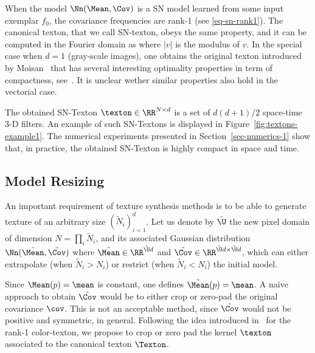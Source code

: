 When the model $\Nn(\Mean,\Cov)$ is a SN model learned from some input exemplar $f_0$, the covariance frequencies are rank-1 (see \eqref{eq-sn-rank1}). The canonical texton, that we call SN-texton, obeys the same property, and it can be computed in the Fourier domain as 
where $|v|$ is the modulus of $v$.
In the special case when $d=1$ (gray-scale images), one obtains the original texton introduced by Moisan~\cite{}
that has several interesting optimality properties in term of compactness, see~\cite{}. It is unclear wether similar properties also hold in the vectorial case. 

The obtained SN-Texton $\texton \in \RR^{N \times d}$ is a set of $d(d+1)/2$ space-time 3-D filters. 
An example of such SN-Textons is displayed in Figure~\ref{fig:textons-example1}. The numerical experiments presented in Section~\ref{sec-numerics-1} show that, in practice, the obtained SN-Texton is highly compact in space and time. 


\subsection{Model Resizing}

An important requirement of texture synthesis methods is to be able to generate texture of an arbitrary size $(\tilde N_i)_{i=1}^d$. Let us denote by $\tilde \U$ the new pixel domain of dimension $N=\prod_i \tilde N_i$, and its associated Gaussian distribution $\Nn(\tilde \Mean, \tilde\Cov)$ where $\tilde \Mean \in \RR^{\tilde \U d}$ and $\tilde \Cov \in \RR^{\tilde \U d \times \tilde \U d}$, which can either extrapolate (when $\tilde N_i>N_i$) or restrict (when $\tilde N_i<N_i$) the initial model. 


Since $\Mean(p) = \mean$ is constant, one defines $\tilde \Mean(p) = \mean$. A naive approach to obtain $\tilde \Cov$ would be to either crop or zero-pad the original covariance $\cov$. This is not an acceptable method, since $\tilde\Cov$ would not be positive and symmetric, in general. Following the idea introduced in~\cite{} for the rank-1 color-texton, we propose to crop or zero pad the kernel $\texton$ associated to the canonical texton $\Texton$.

